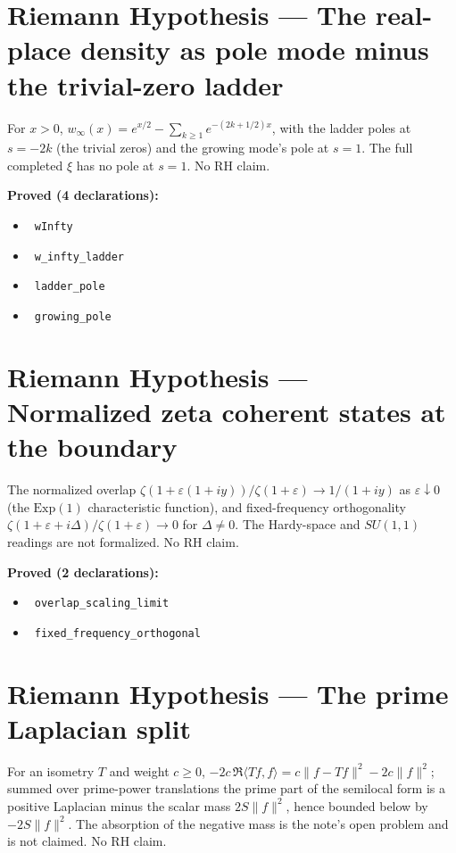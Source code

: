 \documentclass{report}
\theoremstyle{definition}
\begin{document}
\section{Riemann Hypothesis --- The real-place density as pole mode minus the trivial-zero ladder}
For $x>0$, $w_\infty(x)=e^{x/2}-\sum_{k\ge1}e^{-(2k+1/2)x}$, with the ladder poles at $s=-2k$ (the trivial zeros) and the growing mode's pole at $s=1$. The full completed $\xi$ has no pole at $s=1$. No RH claim.

\noindent\textbf{Proved (4 declarations):}
\begin{itemize}
  \item {}\leanok\ \texttt{wInfty}
  \item {}\leanok\ \texttt{w\_infty\_ladder}
  \item {}\leanok\ \texttt{ladder\_pole}
  \item {}\leanok\ \texttt{growing\_pole}
\end{itemize}

\section{Riemann Hypothesis --- Normalized zeta coherent states at the boundary}
The normalized overlap $\zeta(1+\varepsilon(1+iy))/\zeta(1+\varepsilon)\to 1/(1+iy)$ as $\varepsilon\downarrow0$ (the $\mathrm{Exp}(1)$ characteristic function), and fixed-frequency orthogonality $\zeta(1+\varepsilon+i\Delta)/\zeta(1+\varepsilon)\to0$ for $\Delta\ne0$. The Hardy-space and $SU(1,1)$ readings are not formalized. No RH claim.

\noindent\textbf{Proved (2 declarations):}
\begin{itemize}
  \item {}\leanok\ \texttt{overlap\_scaling\_limit}
  \item {}\leanok\ \texttt{fixed\_frequency\_orthogonal}
\end{itemize}

\section{Riemann Hypothesis --- The prime Laplacian split}
For an isometry $T$ and weight $c\ge0$, $-2c\,\Re\langle Tf,f\rangle=c\|f-Tf\|^2-2c\|f\|^2$; summed over prime-power translations the prime part of the semilocal form is a positive Laplacian minus the scalar mass $2S\|f\|^2$, hence bounded below by $-2S\|f\|^2$. The absorption of the negative mass is the note's open problem and is not claimed. No RH claim.
\end{document}
